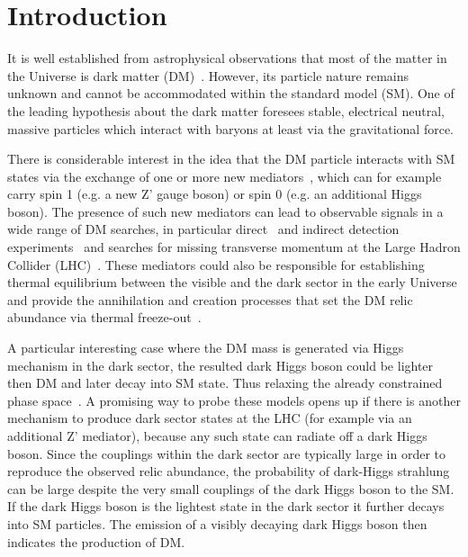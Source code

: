 \newpage 
\section{Introduction}

It is well established from astrophysical observations that most of the matter in the Universe is dark matter (DM)~\cite{FNAL_Review}.
However, its particle nature remains unknown and cannot be accommodated within the standard model (SM). One of the leading hypothesis about the dark matter foresees stable, electrical neutral, massive particles which interact with baryons at least via the gravitational force. 

There is considerable interest in the idea that the DM particle interacts with SM states via the exchange of one or more new mediators~\cite{Frandsen2012,Alves2014,Garny2014}, which can for example carry spin 1 (e.g. a new Z' gauge boson) or spin 0 (e.g. an additional Higgs boson). The presence of such new mediators can lead to observable signals in a wide range of DM searches, in particular direct~\cite{PhysRevLett.117.121303,PhysRevLett.118.021303,PhysRevD.93.052014} and indirect detection experiments~\cite{PhysRevLett.115.231301,PhysRevLett.117.091103} and searches for missing transverse momentum at the Large Hadron Collider (LHC)~\cite{Buchmueller2015}. These mediators could also be responsible for establishing thermal equilibrium between the visible and the dark sector in the early Universe and provide the annihilation and creation processes that set the DM relic abundance via thermal freeze-out~\cite{Chala2015}. 

A particular interesting case where the DM mass is generated via Higgs mechanism in the dark sector, the resulted dark Higgs boson could be lighter then DM and later decay into SM state. Thus relaxing the already constrained phase space~\cite{Duerr2016}. A promising way to probe these models opens up if there is another mechanism to produce dark sector states at the LHC (for example via an additional Z' mediator), because any such state can radiate off a dark Higgs boson. Since the couplings within the dark sector are typically large in order to reproduce the observed relic abundance, the probability of dark-Higgs strahlung can be large despite the very small couplings of the dark Higgs boson to the SM. If the dark Higgs boson is the lightest state in the dark sector it further decays into SM particles. The emission of a visibly decaying dark Higgs boson then indicates the production of DM.

